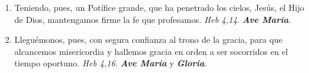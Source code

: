 \documentclass[../../devocionario.tex]{subfiles}
\begin{document}
\begin{enumerate}
        \item Teniendo, pues, un Potífice grande, que ha penetrado los cielos, Jesús, el Hijo de Dios, 
            mantengamos firme la fe que profesamos. \textit{Heb 4,14}. \textbf{\textit{Ave María}}.

        \item Lleguémonos, pues, con segura confianza al trono de la gracia, para que alcancemos misericordia 
            y hallemos gracia en orden a ser socorridos en el tiempo oportuno. \textit{Heb 4,16}. \textbf{\textit{Ave María}} y \textbf{\textit{Gloria}}.

    \end{enumerate}
\end{document}
